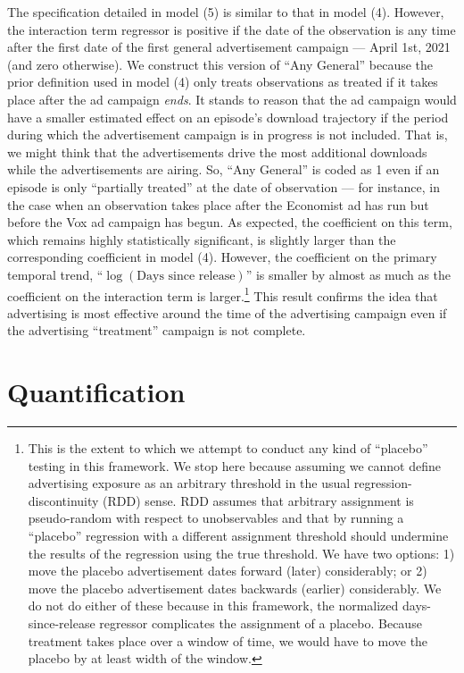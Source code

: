 \documentclass[11pt, letterpaper, twoside]{article}
\begin{document}
The specification detailed in model (5) is similar to that in model (4). However, the interaction term regressor is positive if the date of the observation is any time after the first date of the first general advertisement campaign --- April 1st, 2021 (and zero otherwise). We construct this version of ``Any General'' because the prior definition used in model (4) only treats observations as treated if it takes place after the ad campaign \textit{ends}. It stands to reason that the ad campaign would have a smaller estimated effect on an episode's download trajectory if the period during which the advertisement campaign is in progress is not included. That is, we might think that the advertisements drive the most additional downloads while the advertisements are airing. So, ``Any General'' is coded as 1 even if an episode is only ``partially treated'' at the date of observation --- for instance, in the case when an observation takes place after the Economist ad has run but before the Vox ad campaign has begun. As expected, the coefficient on this term, which remains highly statistically significant, is slightly larger than the corresponding coefficient in model (4). However, the coefficient on the primary temporal trend, ``$\log(\text{Days since release})$'' is smaller by almost as much as the coefficient on the interaction term is larger.\footnote{This is the extent to which we attempt to conduct any kind of ``placebo'' testing in this framework. We stop here because assuming we cannot define advertising exposure as an arbitrary threshold in the usual regression-discontinuity (RDD) sense. RDD assumes that arbitrary assignment is pseudo-random with respect to unobservables and that by running a ``placebo'' regression with a different assignment threshold should undermine the results of the regression using the true threshold. We have two options: 1) move the placebo advertisement dates forward (later) considerably; or 2) move the placebo advertisement dates backwards (earlier) considerably. We do not do either of these because in this framework, the normalized days-since-release regressor complicates the assignment of a placebo. Because treatment takes place over a window of time, we would have to move the placebo by at least width of the window.} This result confirms the idea that advertising is most effective around the time of the advertising campaign even if the advertising ``treatment'' campaign is not complete.\\

\begin{landscape}
    \thispagestyle{empty}
     
\end{landscape}




\section{Quantification}
\end{document}
